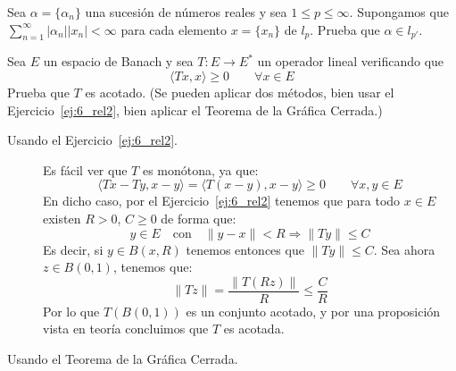 \begin{ejercicio}
    Sea $\alpha = \{\alpha_n\}$ una sucesión de números reales y sea $1\leq p \leq \infty$. Supongamos que $\sum_{n=1}^{\infty} |\alpha_n||x_n| < \infty$ para cada elemento $x=\{x_n\}$ de $l_p$. Prueba que $\alpha\in l_{p'}$.
\end{ejercicio}

\begin{ejercicio}
    Sea $E$ un espacio de Banach y sea $T:E\to E^\ast$ un operador lineal verificando que
    \begin{equation*}
        \langle Tx, x \rangle \geq 0 \qquad \forall x\in E
    \end{equation*}
    Prueba que $T$ es acotado.\newline
    (Se pueden aplicar dos métodos, bien usar el Ejercicio~\ref{ej:6_rel2}, bien aplicar el Teorema de la Gráfica Cerrada.)

    \begin{description}
        \item [Usando el Ejercicio~\ref{ej:6_rel2}.] Es fácil ver que $T$ es monótona, ya que:
            \begin{equation*}
                \langle Tx-Ty,x-y \rangle  = \langle T(x-y),x-y \rangle \geq 0 \qquad \forall x,y\in E
            \end{equation*}
            En dicho caso, por el Ejercicio~\ref{ej:6_rel2} tenemos que para todo $x\in E$ existen $R>0$, $C\geq 0$ de forma que:
            \begin{equation*}
                y\in E \quad \text{con}\quad \|y-x\|<R \Longrightarrow \|Ty\| \leq C
            \end{equation*}
            Es decir, si $y\in B(x,R)$ tenemos entonces que $\|Ty\| \leq C$. Sea ahora $z\in B(0,1)$, tenemos que:
            \begin{equation*}
                \|Tz\| = \dfrac{\|T(Rz)\|}{R} \leq \dfrac{C}{R}
            \end{equation*}
            Por lo que $T(B(0,1))$ es un conjunto acotado, y por una proposición vista en teoría concluimos que $T$ es acotada.
        \item [Usando el Teorema de la Gráfica Cerrada.]  



\end{description}
\end{ejercicio}
